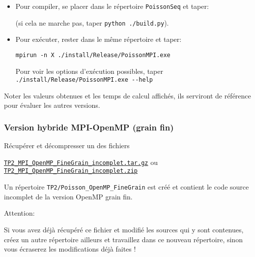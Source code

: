 \documentclass{beamer}
\begin{document}
\begin{frame}[fragile]
\vfill

	
\begin{itemize}
\item 	Pour compiler, se placer dans le répertoire {\tt PoissonSeq} et taper:

		
\vfill
		(si cela ne marche pas, taper \verb|python ./build.py|).
		
\vfill
	\item Pour exécuter, rester dans le même répertoire et taper:

\hspace{2cm}
{\color{blue}\begin{verbatim}
mpirun -n X ./install/Release/PoissonMPI.exe
\end{verbatim}
}

\vfill
Pour voir les options d'exécution possibles, taper \verb|./install/Release/PoissonMPI.exe --help|
\end{itemize}

\vfill
Noter les valeurs obtenues et les temps de calcul affichés, ils serviront de référence pour évaluer les autres versions. 
\vfill
\end{frame}

\begin{frame}[fragile]
	\frametitle{Version hybride MPI-OpenMP (grain fin)}
	
Récupérer et décompresser un des fichiers \bigskip

\href{https://perso.ensta-paris.fr/~tajchman/Seance5/TP2_MPI_OpenMP_FineGrain_incomplet.tar.gz}{\tt TP2\_MPI\_OpenMP\_FineGrain\_incomplet.tar.gz} ou \href{https://perso.ensta-paris.fr/~tajchman/Seance5/TP2_MPI_OpenMP_FineGrain_incomplet.zip}{\tt TP2\_MPI\_OpenMP\_FineGrain\_incomplet.zip}
\bigskip

Un répertoire {\tt TP2/Poisson\_OpenMP\_FineGrain} est créé et contient le code source incomplet de la version OpenMP grain fin.
 
\vfill
{\color{red}
	Attention:
	\bigskip
	
	\begin{minipage}{\textwidth}\color{red}
Si vous avez déjà récupéré ce fichier et modifié les sources qui y sont contenues, créez un autre répertoire ailleurs et travaillez dans ce nouveau répertoire, sinon vous écraserez les modifications déjà faites !
	\end{minipage}
}
\vfill
\end{frame}
\end{document}
